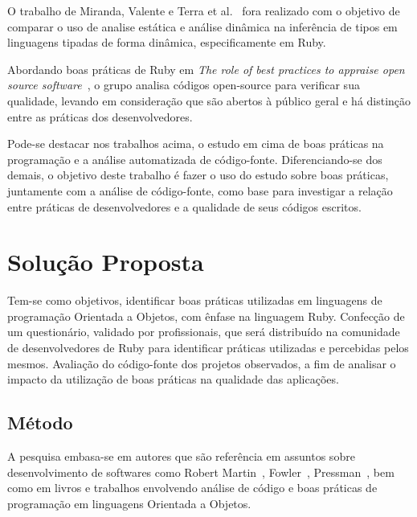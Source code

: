 \documentclass[11pt,a4paper,usenames,dvipsnames]{article}
\begin{document}
O trabalho de Miranda, Valente e Terra et al.~\cite{miranda2016inferencia} fora realizado com o objetivo de comparar o uso de analise estática e análise dinâmica na inferência de tipos em linguagens tipadas de forma dinâmica, especificamente em Ruby.

Abordando boas práticas de Ruby em \textit{The role of best practices to appraise open source software}~\cite{regedor2013role}, o grupo analisa códigos open-source para verificar sua qualidade, levando em consideração que são abertos à público geral e há distinção entre as práticas dos desenvolvedores.

Pode-se destacar nos trabalhos acima, o estudo em cima de boas práticas na programação e a análise automatizada de código-fonte. Diferenciando-se dos demais, o objetivo deste trabalho é fazer o uso do estudo sobre boas práticas, juntamente com a análise de código-fonte, como base para investigar a relação entre práticas de desenvolvedores e a qualidade de seus códigos escritos.


\section{Solução Proposta}\label{sec:Solution}

Tem-se como objetivos, identificar boas práticas utilizadas em linguagens de programação Orientada a Objetos, com ênfase na linguagem Ruby. Confecção de um questionário, validado por profissionais, que será distribuído na comunidade de desenvolvedores de Ruby para identificar práticas utilizadas e percebidas pelos mesmos. Avaliação do código-fonte dos projetos observados, a fim de analisar o impacto da utilização de boas práticas na qualidade das aplicações.

\subsection{Método}

A pesquisa embasa-se em autores que são referência em assuntos sobre desenvolvimento de softwares como Robert Martin~\cite{martin2006agile, Ruby:Refactoring, martin2009clean}, Fowler~\cite{fowler1999refactoring}, Pressman~\cite{Pressaman:Abordagem}, bem como em livros e trabalhos envolvendo análise de código e boas práticas de programação em linguagens Orientada a Objetos\cite{RFR, Climate, Novatec:Qualidade, piveta2005bad, teixeira2007avaliaccao, pereira2016proposta, assisimpacto, gharachorlu2014code}. 
\end{document}
